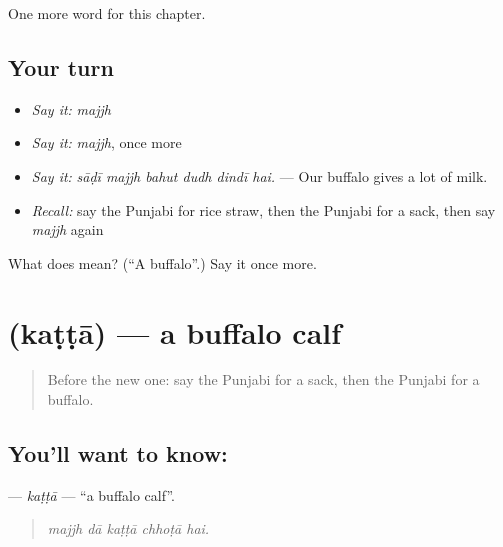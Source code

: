 \begin{grammarlens}[title={What you've built}]
One more word for this chapter.
\end{grammarlens}

\subsection*{Your turn}
\begin{itemize}
\raggedright
  \item \emph{Say it:} \emph{majjh}
  \item \emph{Say it:} \emph{majjh}, once more
  \item \emph{Say it:} \emph{sāḍī majjh bahut dudh dindī hai.} — Our buffalo gives a lot of milk.
  \item \emph{Recall:} say the Punjabi for rice straw, then the Punjabi for a sack, then say \emph{majjh} again
\end{itemize}

\begin{tcolorbox}[breakable,colback=teal!4,colframe=teal!35!black,title={Before you move on}]
What does  mean? (\textquotedblleft{}A buffalo\textquotedblright{}.) Say it once more.
\end{tcolorbox}
\section[\texorpdfstring{\pa{ਕੱਟਾ} (kaṭṭā)}{ਕੱਟਾ (kaṭṭā)}]{ (kaṭṭā) — a buffalo calf}

\label{lesson:PA-C307-katta}



\begin{quote}
Before the new one: say the Punjabi for a sack, then the Punjabi for a buffalo.
\end{quote}

\subsection*{You'll want to know: }
\textbf{} — \emph{kaṭṭā} — \textquotedblleft{}a buffalo calf\textquotedblright{}.

\begin{quote}
    
\end{quote}

\begin{quote}
\emph{majjh dā kaṭṭā chhoṭā hai.}
\end{quote}


